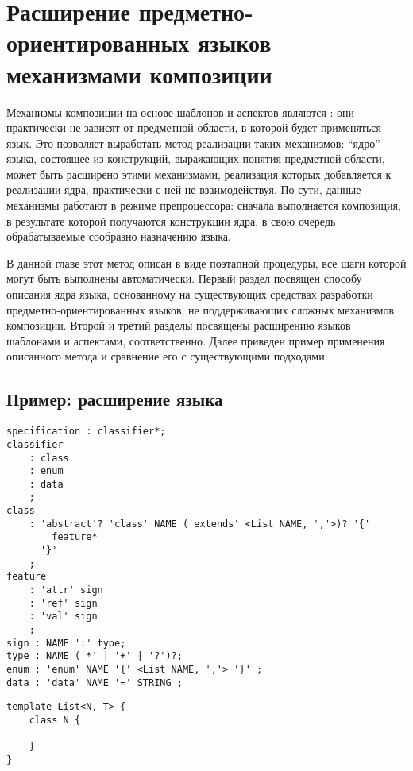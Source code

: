 \part{Расширение предметно-ориентированных языков механизмами композиции}\label{part4}

Механизмы композиции на основе шаблонов и аспектов являются : они практически не зависят от предметной области, в которой будет применяться язык. Это позволяет выработать метод реализации таких механизмов: ``ядро'' языка, состоящее из конструкций, выражающих понятия предметной области, может быть расширено этими механизмами, реализация которых добавляется к реализации ядра, практически с ней не взаимодействуя. По сути, данные механизмы работают в режиме препроцессора: сначала выполняется композиция, в результате которой получаются конструкции ядра, в свою очередь обрабатываемые сообразно назначению языка.

В данной главе этот метод описан в виде поэтапной процедуры, все шаги которой могут быть выполнены автоматически. Первый раздел посвящен способу описания ядра языка, основанному на существующих средствах разработки предметно-ориентированных языков, не поддерживающих сложных механизмов композиции. Второй и третий разделы посвящены расширению языков шаблонами и аспектами, соответственно. Далее приведен пример применения описанного метода и сравнение его с существующими подходами.





\chapter{Пример: расширение языка }

\begin{lstlisting}
specification : classifier*;
classifier
	: class
	: enum
	: data
	;
class
	: 'abstract'? 'class' NAME ('extends' <List NAME, ','>)? '{'
		feature*
	  '}'
	;
feature
	: 'attr' sign
	: 'ref' sign
	: 'val' sign
	;
sign : NAME ':' type;
type : NAME ('*' | '+' | '?')?;
enum : 'enum' NAME '{' <List NAME, ','> '}' ;
data : 'data' NAME '=' STRING ;
\end{lstlisting}

\begin{lstlisting}
template List<N, T> {
	class N {
		
	}
}

\end{lstlisting}

